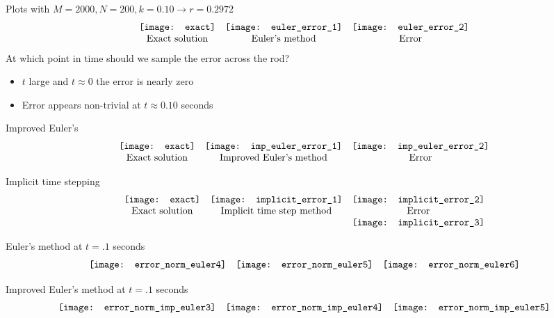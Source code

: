 \documentclass[compress]{beamer}
\begin{document}
\begin{frame}
Plots with $M=2000, N=200, k=0.10 \rightarrow r=0.2972$
\[
\begin{array}{c c c}
\texttt{[image: exact]} 	&	\texttt{[image: euler\_error\_1]}	&	\texttt{[image: euler\_error\_2]}	\\
\text{Exact solution}				&	\text{Euler's method}						&	\text{Error}
\end{array}
\]
At which point in time should we sample the error across the rod?
\begin{itemize}
\item $t$ large and $t\approx 0$ the error is nearly zero
\item Error appears non-trivial at $t\approx 0.10$ seconds
\end{itemize}
\end{frame}

\begin{frame}
Improved Euler's 
\[
\begin{array}{c c c}
\texttt{[image: exact]} 	&	\texttt{[image: imp\_euler\_error\_1]}	&	\texttt{[image: imp\_euler\_error\_2]}	\\
\text{Exact solution}				&	\text{Improved Euler's method}						&	\text{Error}
\end{array}
\]
\end{frame}

\begin{frame}
Implicit time stepping
\[
\begin{array}{c c c}
\texttt{[image: exact]} 	&	\texttt{[image: implicit\_error\_1]}	&	\texttt{[image: implicit\_error\_2]}	\\
\text{Exact solution}				&	\text{Implicit time step method}						&	\text{Error}									\\
									&			&	\texttt{[image: implicit\_error\_3]}													
\end{array}
\]
\end{frame}

\begin{frame}
Euler's method at $t=.1$ seconds
\[
\begin{array}{c c c}
\texttt{[image: error\_norm\_euler4]} 	&	\texttt{[image: error\_norm\_euler5]}	&	\texttt{[image: error\_norm\_euler6]}
\end{array}
\]
\end{frame}

\begin{frame}
Improved Euler's method at $t=.1$ seconds
\[
\begin{array}{c c c}
\texttt{[image: error\_norm\_imp\_euler3]} 	&	\texttt{[image: error\_norm\_imp\_euler4]}	&	\texttt{[image: error\_norm\_imp\_euler5]}
\end{array}
\]
\end{frame}
\end{document}
